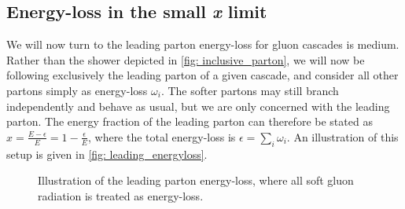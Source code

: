\documentclass[main.tex]{subfiles}
\begin{document}
\subsection{Energy-loss in the small \textit{x} limit}
We will now turn to the leading parton energy-loss for gluon cascades is medium. Rather than the shower depicted in \autoref{fig: inclusive_parton}, we will now be following exclusively the leading parton of a given cascade, and consider all other partons simply as energy-loss \(\omega_i\). The softer partons may still branch independently and behave as usual, but we are only concerned with the leading parton. The energy fraction of the leading parton can therefore be stated as \(x = \frac{E - \epsilon}{E} = 1- \frac{\epsilon}{E}\), where the total energy-loss is \(\epsilon = \sum_i \omega_i\).  An illustration of this setup is given in \autoref{fig: leading_energyloss}.
\begin{figure}[htb]
    \centering
\caption{Illustration of the leading parton energy-loss, where all soft gluon radiation is treated as energy-loss.}
\label{fig: leading_energyloss}
\end{figure}
\end{document}

